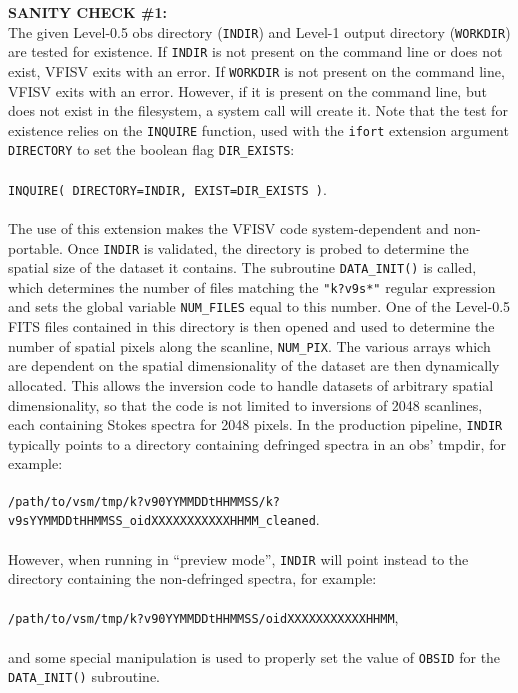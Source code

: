 \documentclass[11pt]{article}
\begin{document}
\textbf{SANITY CHECK \#1:}\\
The given Level-0.5 obs directory (\texttt{INDIR}) and Level-1 output directory (\texttt{WORKDIR})
are tested for existence.  If \texttt{INDIR} is not present on the command line or does not exist,
VFISV exits with an error.  If \texttt{WORKDIR} is not present on the command line, VFISV
exits with an error.  However, if it is present on the command line, but does not exist in the
filesystem, a system call will create it.  Note that the test for existence relies on the
\texttt{INQUIRE} function, used with the \texttt{ifort} extension argument \texttt{DIRECTORY}
to set the boolean flag \texttt{DIR\_EXISTS}:\\
\\
\texttt{INQUIRE( DIRECTORY=INDIR, EXIST=DIR\_EXISTS )}.\\
\\
The use of this extension makes the VFISV code system-dependent and non-portable.  
Once \texttt{INDIR} is validated, the directory is probed to determine the spatial
size of the dataset it contains.  The subroutine \texttt{DATA\_INIT()} is called, which
determines the number of files matching the \texttt{"k?v9s*"} regular expression and
sets the global variable \texttt{NUM\_FILES} equal to this number.  One of the Level-0.5
FITS files contained in this directory is then opened and used to determine the number of spatial
pixels along the scanline, \texttt{NUM\_PIX}.  The various arrays which are dependent on
the spatial dimensionality of the dataset are then dynamically allocated.  This allows the inversion
code to handle datasets of arbitrary spatial dimensionality, so that the code is not
limited to inversions of 2048 scanlines, each containing Stokes spectra for 2048 pixels.  In
the \solisvsm production pipeline, \texttt{INDIR} typically points to a directory containing
defringed spectra in an obs' tmpdir, for example:\\
\\
{\small \texttt{/path/to/vsm/tmp/k?v90YYMMDDtHHMMSS/k?v9sYYMMDDtHHMMSS\_oidXXXXXXXXXXXHHMM\_cleaned}}.\\
\\
However, when running in ``preview mode'', \texttt{INDIR} will point instead to the directory
containing the non-defringed spectra, for example:\\
\\
{\small \texttt{/path/to/vsm/tmp/k?v90YYMMDDtHHMMSS/oidXXXXXXXXXXXHHMM}},\\
\\
and some special manipulation is used to properly set the value of \texttt{OBSID} for the \texttt{DATA\_INIT()}
subroutine.\\
\end{document}
